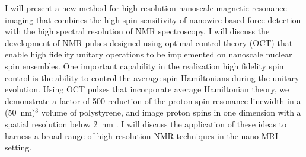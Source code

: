 I will present a new method for high-resolution nanoscale magnetic resonance imaging that combines the high spin sensitivity of nanowire-based force detection with the high spectral resolution of NMR spectroscopy. I will discuss the development of NMR pulses designed using optimal control theory (OCT) that enable high fidelity unitary operations to be implemented on nanoscale nuclear spin ensembles.  One important capability in the realization high fidelity spin control is the ability to control the average spin Hamiltonians during the unitary evolution.  Using OCT pulses that incorporate average Hamiltonian theory, we demonstrate a factor of 500 reduction of the proton spin resonance linewidth in a (50~nm)$^3$ volume of polystyrene, and image proton spins in one dimension with a spatial resolution below 2~nm \cite{1707.01062v1}. I will discuss the application of these ideas to harness a broad range of high-resolution NMR techniques in the nano-MRI setting.